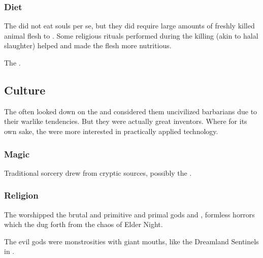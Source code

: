\subsubsection{Diet}
The \aryothim did not eat souls per se, but they did require large amounts of freshly killed animal flesh to . 
Some religious rituals performed during the killing (akin to halal slaughter) helped and made the flesh more nutritious.

The \aryothim {}. 









\subsection{Culture}





The \quiljaaran{} often looked down on the \aryoth{} and considered them uncivilized barbarians due to their warlike tendencies. 
But they were actually great inventors. 
Where  for its own sake, the \aryothim{} were more interested in practically applied technology. 





\subsubsection{Magic}
Traditional \aryoth sorcery drew from cryptic sources, possibly the . 





\subsubsection{Religion}
The \aryothim worshipped the brutal and primitive and primal gods  and , formless horrors which the dug forth from the chaos of Elder Night. 

The evil \aryoth gods were monstrosities with giant mouths, like the Dreamland Sentinels in \cite{MichaelNelson:FallofCthulhuIII}. 


